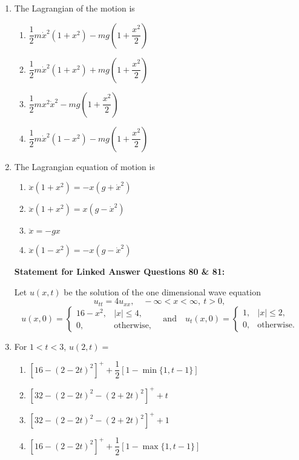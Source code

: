\documentclass[journal]{IEEEtran}
\numberwithin{equation}{enumi}
\numberwithin{figure}{enumi}
\begin{document}
\begin{enumerate}
\item The Lagrangian of the motion is      \hfill{}     
\begin{multicols}{2}
    \begin{enumerate}
        \item $\dfrac{1}{2} m \dot{x}^2 (1 + x^2) - mg \left(1 + \dfrac{x^2}{2} \right)$
        \item $\dfrac{1}{2} m \dot{x}^2 (1 + x^2) + mg \left(1 + \dfrac{x^2}{2} \right)$
        \item $\dfrac{1}{2} m x^2 \dot{x}^2 - mg \left(1 + \dfrac{x^2}{2} \right)$
        \item $\dfrac{1}{2} m \dot{x}^2 (1 - x^2) - mg \left(1 + \dfrac{x^2}{2} \right)$
    \end{enumerate}
    \end{multicols}

    
\item The Lagrangian equation of motion is    \hfill{}
\begin{enumerate}
    

    \item $\ddot{x}(1 + x^2) = -x(g + \dot{x}^2)$
    \item $\ddot{x}(1 + x^2) = x(g - \dot{x}^2)$
   
    \item $\ddot{x} = -g x$ 
    \item $\ddot{x}(1 - x^2) = -x(g - \dot{x}^2)$
    
\end{enumerate}

\bigskip

\textbf{Statement for Linked Answer Questions 80 \& 81:}

Let $u(x,t)$ be the solution of the one dimensional wave equation
\[
u_{tt} = 4u_{xx}, \quad -\infty < x < \infty,\ t > 0,
\]
\[
u(x,0) =
\begin{cases}
16 - x^2, & |x| \leq 4, \\
0, & \text{otherwise},
\end{cases}
\quad \text{and} \quad
u_t(x,0) =
\begin{cases}
1, & |x| \leq 2, \\
0, & \text{otherwise}.
\end{cases}
\]

\item For $1 < t < 3$, $u(2,t) =$   \hfill{}
\begin{enumerate}
    \item $\left[16 - (2 - 2t)^2\right]^+ + \dfrac{1}{2}\left[1 - \min\{1, t - 1\}\right]$
    \item $\left[32 - (2 - 2t)^2 - (2 + 2t)^2\right]^+ + t$
    \item $\left[32 - (2 - 2t)^2 - (2 + 2t)^2\right]^+ + 1$
    \item $\left[16 - (2 - 2t)^2\right]^+ + \dfrac{1}{2}\left[1 - \max\{1, t - 1\}\right]$
\end{enumerate}




\end{enumerate}
\end{document}
